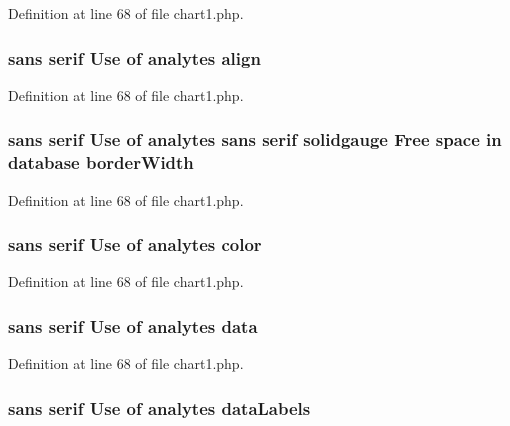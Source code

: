 Definition at line 68 of file chart1.\-php.

\hypertarget{chart1_8php_a245d529baa23709e9ec659eb954ac212}{
\subsubsection[{align}]{ sans serif Use of analytes align}}\label{chart1_8php_a245d529baa23709e9ec659eb954ac212}


Definition at line 68 of file chart1.\-php.

\hypertarget{chart1_8php_a5abb4048aa2be521da8031dbab475850}{
\subsubsection[{border\-Width}]{ sans serif Use of analytes sans serif solidgauge Free space in database border\-Width}}\label{chart1_8php_a5abb4048aa2be521da8031dbab475850}


Definition at line 68 of file chart1.\-php.

\hypertarget{chart1_8php_ae68251bab2d16bd206603de96a155284}{
\subsubsection[{color}]{ sans serif Use of analytes color}}\label{chart1_8php_ae68251bab2d16bd206603de96a155284}


Definition at line 68 of file chart1.\-php.

\hypertarget{chart1_8php_ab3ed669f4b3fdb8c88f3a190fb907de0}{
\subsubsection[{data}]{ sans serif Use of analytes data}}\label{chart1_8php_ab3ed669f4b3fdb8c88f3a190fb907de0}


Definition at line 68 of file chart1.\-php.

\hypertarget{chart1_8php_a6cc4de94e7120b93b61ba6c324467460}{
\subsubsection[{data\-Labels}]{ sans serif Use of analytes data\-Labels}}\label{chart1_8php_a6cc4de94e7120b93b61ba6c324467460}


